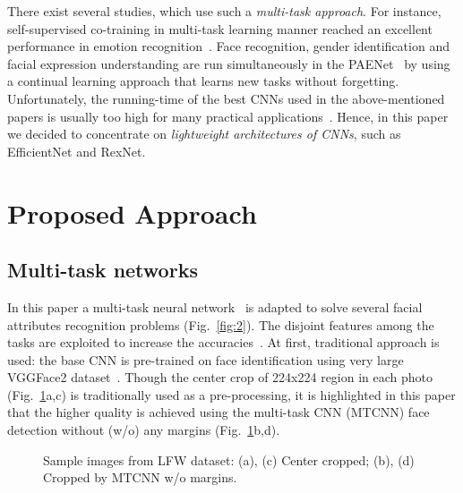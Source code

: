 \documentclass[runningheads]{llncs}
\begin{document}
There exist several studies, which use such a \textit{multi-task approach}. For instance, self-supervised co-training in multi-task learning manner reached an excellent performance in emotion recognition~\cite{pourmirzaei2021using}. Face recognition, gender identification and facial expression understanding are run simultaneously in the PAENet~\cite{hung2019increasingly} by using a continual learning approach that learns new tasks without forgetting. Unfortunately, the running-time of the best CNNs used in the above-mentioned papers is usually too high for many practical applications~\cite{savchenko2021fast}. Hence, in this paper we decided to concentrate on \textit{lightweight architectures of CNNs}, such as EfficientNet and RexNet. 

\section{Proposed Approach}\label{sec:3}
\subsection{Multi-task networks} 
In this paper a multi-task neural network~\cite{savchenko2019peerj} is adapted to solve several facial attributes recognition problems (Fig.~\ref{fig:2}). The disjoint features among the tasks are exploited to increase the accuracies~\cite{wang2021multi}. At first, traditional approach is used: the base CNN is pre-trained on face identification using very large VGGFace2 dataset~\cite{cao2018vggface2}. Though the center crop of 224x224 region in each photo (Fig.~\ref{fig:1}a,c) is traditionally used as a pre-processing, it is highlighted in this paper that the higher quality is achieved using the multi-task CNN (MTCNN) face detection without (w/o) any margins (Fig.~\ref{fig:1}b,d). 

\begin{figure}[t]
 \centering
{}
 \caption{Sample images from LFW dataset: (a), (c) Center cropped; (b), (d) Cropped by MTCNN w/o margins.}
\label{fig:1}
\end{figure}
\end{document}
